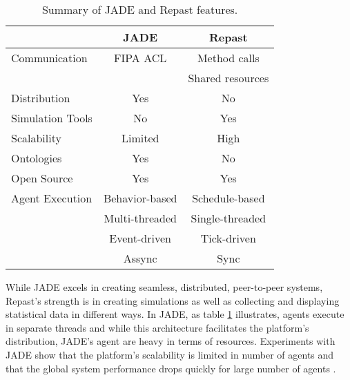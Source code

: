 \begin{table}[h]
	\caption{Summary of JADE and Repast features.}
	\label{tab:jadevsrep}
	\begin{center}
		\begin{tabular}{l|cc}
		\hline

		\hline
		\textbf{} & \textbf{JADE} & \textbf{Repast} \\ %
		\hline
			Communication & FIPA ACL &  Method calls  \\ %
						  &			 &  Shared resources \\
		\hline
			Distribution & Yes & No \\ %
		\hline
			Simulation Tools & No & Yes \\ %
		\hline
			Scalability & Limited & High \\ %
		\hline
			Ontologies & Yes & No \\ %
		\hline
			Open Source & Yes & Yes \\ %
		\hline
			Agent Execution & Behavior-based & Schedule-based  \\ %
							& Multi-threaded & Single-threaded \\ %
							& Event-driven   & Tick-driven 	   \\ %
							& Assync		 & Sync 		   \\ %
		\hline
		\end{tabular}
	\end{center}
\end{table}

While JADE excels in creating seamless, distributed, peer-to-peer systems,
Repast's strength is in creating simulations as well as collecting and displaying statistical data in different ways. In JADE, as table \ref{tab:jadevsrep} illustrates, agents execute in separate threads and while this architecture facilitates the platform's distribution, JADE's agent are heavy in terms of resources. Experiments with JADE show that the platform's scalability is limited in number of agents and that the global system performance drops quickly for large number of agents \cite{mengistu2008scalability} \cite{garcia2011misia}.

